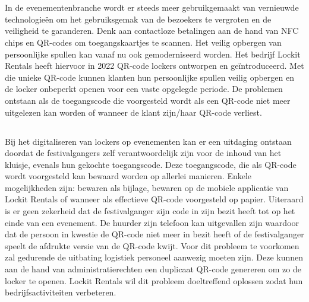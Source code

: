 
\chapter{}%
\label{ch:inleiding}

In de evenementenbranche wordt er steeds meer gebruikgemaakt van vernieuwde technologieën om het gebruiksgemak van de bezoekers te vergroten en de veiligheid te garanderen. Denk aan contactloze betalingen aan de hand van NFC chips en QR-codes om toegangskaartjes te scannen. Het veilig opbergen van persoonlijke spullen kan vanaf nu ook gemoderniseerd worden. Het bedrijf Lockit Rentals heeft hiervoor in 2022 QR-code lockers ontworpen en geïntroduceerd. Met die unieke QR-code kunnen klanten hun persoonlijke spullen veilig opbergen en de locker onbeperkt openen voor een vaste opgelegde periode. De problemen ontstaan als de toegangscode die voorgesteld wordt als een QR-code niet meer uitgelezen kan worden of wanneer de klant zijn/haar QR-code verliest. 

\newpage

\section{}%
\label{sec:probleemstelling}

Bij het digitaliseren van lockers op evenementen kan er een uitdaging ontstaan doordat de festivalgangers zelf verantwoordelijk zijn voor de inhoud van het kluisje, evenals hun gekochte toegangscode. Deze toegangscode, die als QR-code wordt voorgesteld kan bewaard worden op allerlei manieren. Enkele mogelijkheden zijn: bewaren als bijlage, bewaren op de mobiele applicatie van Lockit Rentals of wanneer als effectieve QR-code voorgesteld op papier. Uiteraard is er geen zekerheid dat de festivalganger zijn code in zijn bezit heeft tot op het einde van een evenement. De huurder zijn telefoon kan uitgevallen zijn waardoor dat de persoon in kwestie de QR-code niet meer in bezit heeft of de festivalganger speelt de afdrukte versie van de QR-code kwijt. Voor dit probleem te voorkomen zal gedurende de uitbating logistiek personeel aanwezig moeten zijn. Deze kunnen aan de hand van administratierechten een duplicaat QR-code genereren om zo de locker te openen. Lockit Rentals wil dit probleem doeltreffend oplossen zodat hun bedrijfsactiviteiten verbeteren. \newline 

